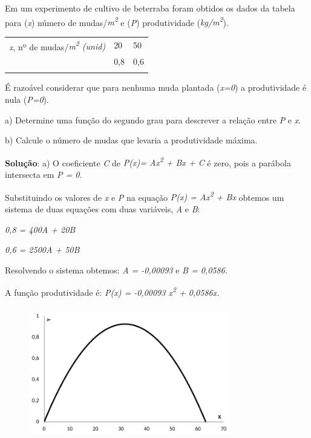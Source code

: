 \begin{texemplo}
Em um experimento de cultivo de beterraba foram obtidos os dados da tabela para (\textit{x}) número de mudas/\textit{m\textsuperscript{2}} e (\textit{P}) produtividade (\textit{kg/m\textsuperscript{2}}).

\begin{table}[H]
 			\centering
\begin{tabular}{p{1.68in}p{0.38in}p{0.39in}}
\hline
\multicolumn{1}{|p{1.68in}}{\textit{x}, nº de mudas/\textit{m\textsuperscript{2} (unid)}} & 
\multicolumn{1}{|p{0.38in}}{20} & 
\multicolumn{1}{|p{0.39in}|}{50} \\
\hhline{---}
\multicolumn{1}{|p{1.68in}}{\textit{P}, produtividade (kg/\textit{ m\textsuperscript{2})}} & 
\multicolumn{1}{|p{0.38in}}{0,8} & 
\multicolumn{1}{|p{0.39in}|}{0,6} \\
\hhline{---}

\end{tabular}
 \end{table}

É razoável considerar que para nenhuma muda plantada (\textit{x=0}) a produtividade é nula (\textit{P=0}). 

	a) Determine uma função do segundo grau para descrever a relação entre \textit{P} e \textit{x}.

	b) Calcule o número de mudas que levaria a produtividade máxima.

\textbf{Solução}: a) O coeficiente \textit{C}  de \textit{P(x)= Ax\textsuperscript{2} + Bx + C } é zero, pois a parábola intersecta em \textit{P = 0}.

Substituindo os valores de \textit{x} e \textit{P} na equação   \textit{P(x) = Ax\textsuperscript{2} + Bx }obtemos um sistema de duas equações com duas variáveis, \textit{A} e \textit{B}:

\textit{0,8 = 400A  + 20B}

\textit{0,6 = 2500A + 50B}

Resolvendo o sistema obtemos:\textit{ A = -0,00093  }e \textit{ B = 0,0586. }

A função produtividade é:  \textit{P(x) = -0,00093  x\textsuperscript{2} + 0,0586x.}

\begin{figure}[H]
	\begin{Center}
		\includegraphics[width=3.46in,height=2.26in]{capitulos/funcao_do_segundo_grau/media/image17.pdf}
	\end{Center}
\end{figure}


\end{texemplo}
